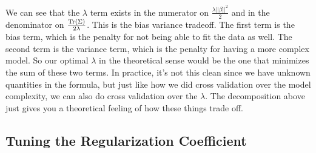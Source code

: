   We can see that the $\lambda$ term exists in the numerator on $\frac{\lambda ||\beta||^2}{2}$ and in the denominator on $\frac{\Tr(\Sigma)}{2 \lambda}$. This is the bias variance tradeoff. The first term is the bias term, which is the penalty for not being able to fit the data as well. The second term is the variance term, which is the penalty for having a more complex model. So our optimal $\lambda$ in the theoretical sense would be the one that minimizes the sum of these two terms. In practice, it's not this clean since we have unknown quantities in the formula, but just like how we did cross validation over the model complexity, we can also do cross validation over the $\lambda$. The decomposition above just gives you a theoretical feeling of how these things trade off. 

\subsection{Tuning the Regularization Coefficient}
